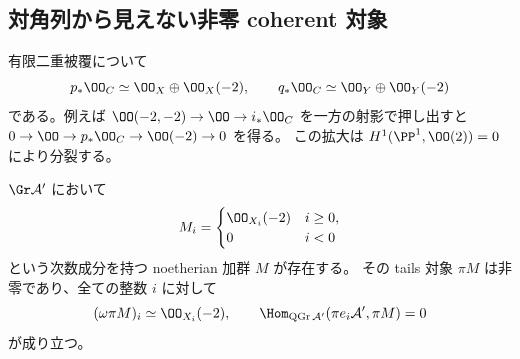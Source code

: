 \subsection{対角列から見えない非零 coherent 対象}

有限二重被覆について
\begin{equation}\label{ruled-eq:double-cover-push}
 p_*\OO_C\simeq\OO_X\oplus\OO_X(-2),\qquad
 q_*\OO_C\simeq\OO_Y\oplus\OO_Y(-2)
\end{equation}
である。例えば $\OO(-2,-2)\to\OO\to i_*\OO_C$ を一方の射影で押し出すと
$0\to\OO\to p_*\OO_C\to\OO(-2)\to0$ を得る。
この拡大は $H^1(\PP^1,\OO(2))=0$ により分裂する。

\begin{proposition}\label{ruled-prop:invisible-module}
$\Gr\mathcal A'$ において
\[
 M_i=\begin{cases}
 \OO_{X_i}(-2)&i\ge0,\\
 0&i<0
 \end{cases}
\]
という次数成分を持つ noetherian 加群 $M$ が存在する。
その tails 対象 $\pi M$ は非零であり、全ての整数 $i$ に対して
\[
 (\omega\pi M)_i\simeq\OO_{X_i}(-2),\qquad
 \Hom_{\operatorname{QGr}\mathcal A'}(\pi e_i\mathcal A',\pi M)=0
\]
が成り立つ。
\end{proposition}

